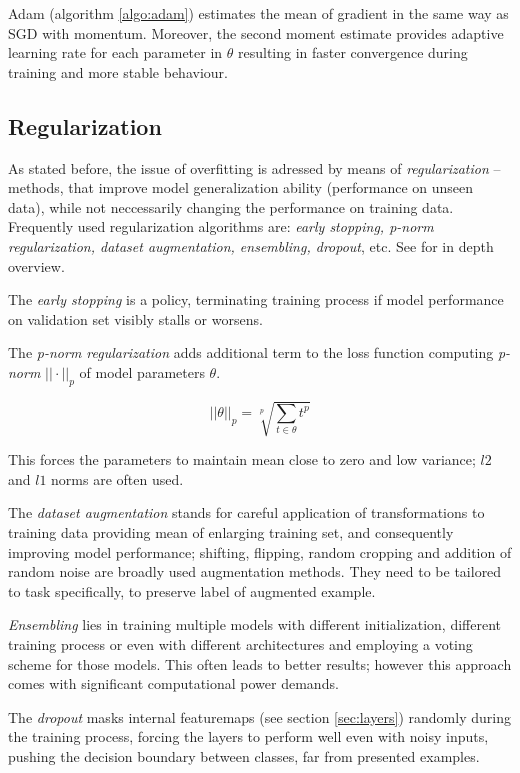 Adam (algorithm \ref{algo:adam}) estimates the mean of gradient in the same way as SGD with momentum. Moreover, the second moment estimate provides adaptive learning rate for each parameter in $\theta$ resulting in faster convergence during training and more stable behaviour.

\subsection{Regularization}
\label{sec:regularization}

As stated before, the issue of overfitting is adressed by means of \emph{regularization} -- methods, that improve model generalization ability (performance on unseen data), while not neccessarily changing the performance on training data. Frequently used regularization algorithms are: \emph{early stopping, p-norm regularization, dataset augmentation, ensembling, dropout}, etc. See \cite{Goodfellow-et-al-2016} for in depth overview.

The \emph{early stopping} is a policy, terminating training process if model performance on validation set visibly stalls or worsens. 

The \emph{p-norm regularization} adds additional term to the loss function computing \emph{p-norm} $||\cdot||_p$ of model parameters $\theta$.

\begin{equation} \label{eqn:pnorm}
||\theta||_p = \sqrt[p]{\sum_{t \in \theta} t^p}
\end{equation}

This forces the parameters to maintain mean close to zero and low variance; $l2$ and $l1$ norms are often used.

The \emph{dataset augmentation} stands for careful application of transformations to training data providing mean of enlarging training set, and consequently improving model performance; shifting, flipping, random cropping and addition of random noise are broadly used augmentation methods. They need to be tailored to task specifically, to preserve label of augmented example. 

\emph{Ensembling} lies in training multiple models with different initialization, different training process or even with different architectures and employing a voting scheme for those models. This often leads to better results; however this approach comes with significant computational power demands.

The \emph{dropout} masks internal featuremaps (see section \ref{sec:layers}) randomly during the training process, forcing the layers to perform well even with noisy inputs, pushing the decision boundary between classes, far from presented examples.

